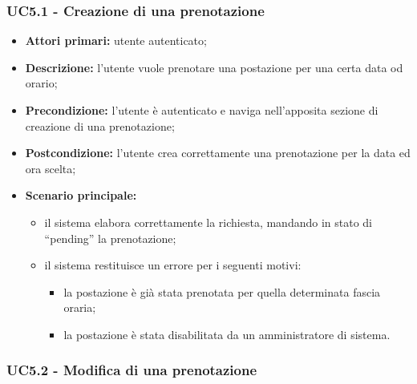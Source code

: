 \subsubsection{UC5.1 - Creazione di una prenotazione}

\begin{itemize}
\item \textbf{Attori primari:} utente autenticato;
\item \textbf{Descrizione:} l’utente vuole prenotare una postazione per una certa data od orario;
\item \textbf{Precondizione:} l’utente è autenticato e naviga nell’apposita sezione di creazione di una prenotazione;
\item \textbf{Postcondizione:} l’utente crea correttamente una prenotazione per la data ed ora scelta;
\item \textbf{Scenario principale:} 
	\begin{itemize}
		\item il sistema elabora correttamente la richiesta, mandando in stato di “pending” la prenotazione;
		\item il sistema restituisce un errore per i seguenti motivi:
		\begin{itemize}
			\item la postazione è già stata prenotata per quella determinata fascia oraria;
			\item la postazione è stata disabilitata da un amministratore di sistema.	
		\end{itemize}
	\end{itemize}
\end{itemize}

\subsubsection{UC5.2 - Modifica di una prenotazione}

